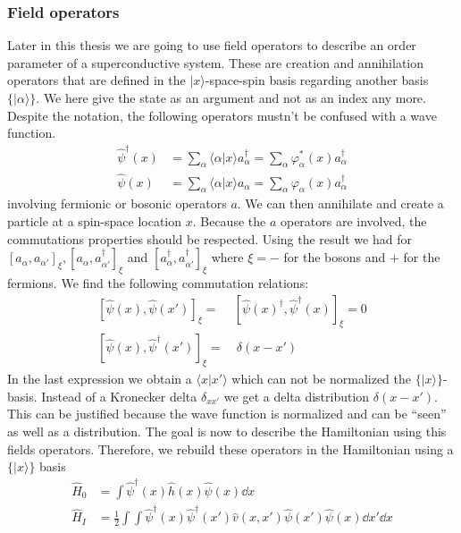 \documentclass[../main.tex]{subfile}
\begin{document}
\subsubsection{Field operators}
Later in this thesis we are going to use field operators to describe an order parameter of a superconductive system. These are 
creation and annihilation operators that are defined in the $|x\rangle$-space-spin basis regarding another basis $\{|\alpha\rangle\}$. We here give the state as an argument
and not as an index any more. Despite the notation, the following operators mustn't be confused with a wave function.
\begin{align}
    \hat{\psi}^{\dagger}(x) &= \sum_{\alpha} \langle\alpha|x\rangle a_{\alpha}^{\dagger} = \sum_{\alpha} \varphi_{\alpha}^{\ast}(x) a_{\alpha}^{\dagger} \label{eq:FieldOp}\\ 
    \hat{\psi}(x) &= \sum_{\alpha} \langle\alpha|x\rangle a_{\alpha} = \sum_{\alpha} \varphi_{\alpha}(x) a_{\alpha}^{\dagger}\label{eq:FieldOpDag}
\end{align}
involving fermionic or bosonic operators $a$. We can then annihilate and create a particle at a spin-space location $x$. Because the $a$ operators
are involved, the commutations properties should be respected. Using the result we had for $[a_{\alpha}, a_{\alpha'}]_{\xi},
[a_{\alpha}, a_{\alpha'}^{\dagger}]_{\xi}$ and $[a_{\alpha}^{\dagger}, a_{\alpha'}^{\dagger}]_{\xi}$ where $\xi = -$ for the bosons and $+$ for the fermions. We find the following commutation relations:
\begin{align*}
    \left[\hat{\psi}(x), \hat{\psi}(x')\right]_{\xi} = & \left[\hat{\psi}(x)^{\dagger}, \hat{\psi}^{\dagger}(x)\right]_{\xi} = 0 \\
    \left[\hat{\psi}(x), \hat{\psi}^{\dagger}(x')\right]_{\xi} = &~ \delta(x-x')
\end{align*}
In the last expression we obtain a $\langle x | x '\rangle$ which can not be normalized the $\{|x\rangle\}$-basis. Instead of a Kronecker delta $\delta_{xx'}$
we get a delta distribution $\delta(x-x')$. This can be justified because the wave function is normalized and can be ``seen'' as well as a distribution.
The goal is now to describe the Hamiltonian using this fields operators. Therefore, we rebuild these operators in the Hamiltonian using a $\{|x\rangle\}$ basis
\begin{align*}
    \hat{H}_0 &=  \int \hat{\psi}^{\dagger}(x) \hat{h}(x)\hat{\psi}(x) \dd x\\
    \hat{H}_I &= \frac{1}{2} \int \int  \hat{\psi}^{\dagger}(x) \hat{\psi}^{\dagger}(x') \hat{v}(x,x')\hat{\psi}(x') \hat{\psi}(x) \dd x' \dd x
\end{align*}
\end{document}
